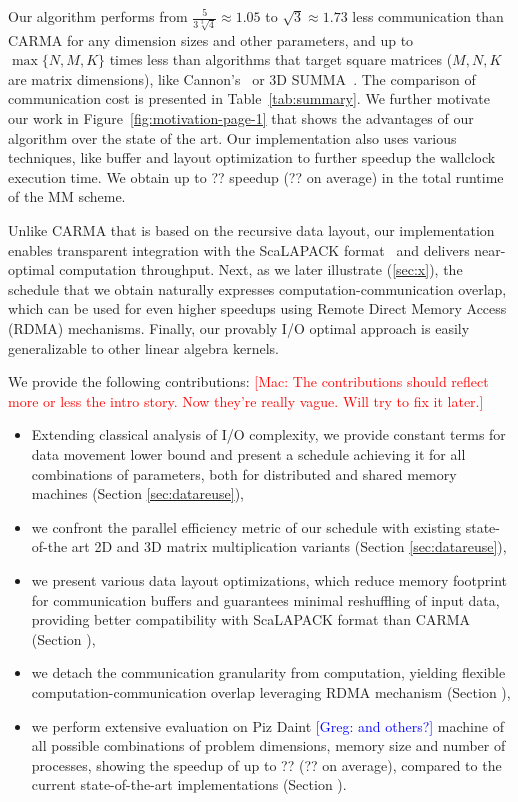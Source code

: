 \documentclass[sigplan,review,anonymous]{acmart}\settopmatter{printfolios=true,printccs=false,printacmref=false}
\newcommand\greg[1]{\textcolor{blue}{[Greg: #1]}}
\newcommand\mac[1]{\textcolor{red}{[Mac: #1]}}
\begin{document}
Our algorithm performs from $\frac{5}{3 \sqrt[3]{4}} \approx 1.05$ to $\sqrt{3} 
\approx 1.73$ less
communication than CARMA for any dimension sizes and other parameters, and up
to $\max\{N,M,K\}$ times less than algorithms that target square matrices ($M,
N, K$ are matrix dimensions), like Cannon's~\cite{generalCannon} or 3D
SUMMA~\cite{summa}. The comparison of communication cost is presented in
Table~\ref{tab:summary}. 
%
We further motivate our work in Figure~\ref{fig:motivation-page-1} that
shows the advantages of our algorithm over the state of the art. Our 
implementation also uses various techniques, like buffer and layout 
optimization to further speedup the wallclock execution 
time. We
obtain up to ?? speedup (?? on average) in the total runtime of the MM scheme.

Unlike CARMA that is based on the recursive data layout, our implementation
enables transparent integration with the ScaLAPACK format~\cite{cite} and
delivers near-optimal computation throughput.
%
Next, as we later illustrate (\cref{sec:x}), the schedule that we obtain
naturally expresses computation-communication overlap, which can be
used for even higher speedups using Remote Direct Memory Access (RDMA)
mechanisms.
%
Finally, our provably I/O optimal approach is easily generalizable to other
linear algebra kernels. 

We provide the following contributions:
\mac{The contributions should reflect more or less the intro story.
Now they're really vague. Will try to fix it later.}

\begin{itemize}[leftmargin=1em]
%
\item Extending classical analysis of I/O complexity, we provide 
constant terms for data movement lower bound and present a schedule 
achieving it for all combinations of parameters, both for distributed and 
shared memory machines (Section \ref{sec:datareuse}),
%
\item we confront the parallel efficiency metric of our schedule with 
existing state-of-the art 2D and 3D matrix multiplication variants 
(Section \ref{sec:datareuse}),
%
\item we present various data layout optimizations, which reduce memory 
footprint for communication buffers and guarantees minimal reshuffling 
of input data, providing better compatibility with ScaLAPACK format 
than CARMA (Section \label{sec:implementation}),
%
\item we detach the communication granularity from computation, 
yielding flexible computation-communication overlap leveraging RDMA 
mechanism (Section \label{sec:implementation}),
%
\item we perform extensive evaluation on Piz Daint \greg{and others?} 
machine of all possible combinations of problem dimensions, memory size 
and number of processes, showing the speedup of up to ?? (?? on average), 
compared to the current state-of-the-art implementations
(Section \label{sec:evaluation}).
%
\end{itemize}
\end{document}

